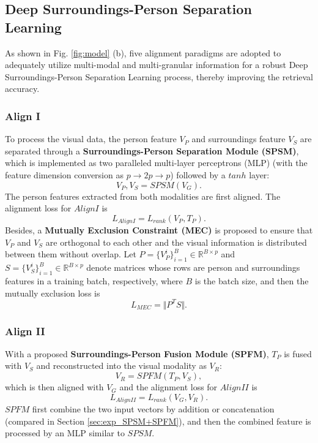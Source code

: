 \documentclass[sigconf]{acmart}
\begin{document}
\subsection{Deep Surroundings-Person Separation Learning}
\label{sec:feature_alignment}
As shown in Fig. \ref{fig:model} (b), five alignment paradigms are adopted to adequately utilize multi-modal and multi-granular information for a robust Deep Surroundings-Person Separation Learning process, thereby improving the retrieval accuracy.
\subsubsection{Align I}
To process the visual data, the person feature $V_{P}$ and surroundings feature $V_{S}$ are separated through a \textbf{Surroundings-Person Separation Module (SPSM)}, which is implemented as two paralleled multi-layer perceptrons (MLP) (with the feature dimension conversion as $p \rightarrow 2p \rightarrow p$) followed by a $tanh$ layer:
\begin{equation}
	V_{P}, V_{S} = SPSM(V_{G}).
\end{equation}
The person features extracted from both modalities are first aligned. The alignment loss for $Align I$ is
\begin{equation}
	L_{AlignI} = L_{rank}(V_{P}, T_{P}).
\end{equation}
Besides, a \textbf{Mutually Exclusion Constraint (MEC)} is proposed to ensure that $V_{P}$ and $V_{S}$ are orthogonal to each other and the visual information is distributed between them without overlap. Let $P = \{V^{i}_{P}\}_{i = 1}^{B} \in \mathbb{R}^{B \times p}$ and $S = \{V^{i}_{S}\}_{i = 1}^{B} \in \mathbb{R}^{B \times p}$ denote matrices whose rows are person and surroundings features in a training batch, respectively, where $B$ is the batch size, and then the mutually exclusion loss is
\begin{equation}
	L_{MEC} = \Vert P^{T}S \Vert.
\end{equation}

\subsubsection{Align II}
With a proposed \textbf{Surroundings-Person Fusion Module (SPFM)}, $T_{P}$ is fused with $V_{S}$ and reconstructed into the visual modality as $V_{R}$:
\begin{equation}
	V_{R} = SPFM(T_{P}, V_{S}),
\end{equation}
which is then aligned with $V_{G}$ and the alignment loss for $AlignII$ is
\begin{equation}
	L_{AlignII} = L_{rank}(V_{G}, V_{R}).
\end{equation}
$SPFM$ first combine the two input vectors by addition or concatenation (compared in Section \ref{sec:exp_SPSM+SPFM}), and then the combined feature is processed by an MLP similar to $SPSM$.
\end{document}
